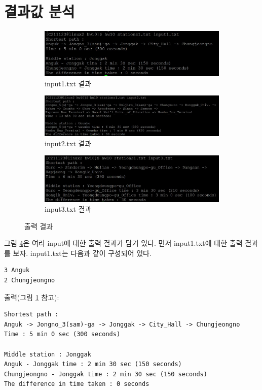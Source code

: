 \documentclass{article}
\begin{document}
\section{결과값 분석}
\begin{figure}
    \centering
    \begin{subfigure} {\textwidth}
        \centering
        \includegraphics[width=\textwidth]{result_1.jpg}
        \caption{input1.txt 결과}
        \label{fig:result1}
    \end{subfigure}
    \vfill
    \begin{subfigure} {\textwidth}
        \centering
        \includegraphics[width=\textwidth]{result_2.jpg}
        \caption{input2.txt 결과}
        \label{fig:result2}
    \end{subfigure}
    \vfill
    \begin{subfigure} {\textwidth}
        \centering
        \includegraphics[width=\textwidth]{result_3.jpg}
        \caption{input3.txt 결과}
        \label{fig:result3}
    \end{subfigure}
    \caption{출력 결과}
    \label{fig:result_all}
\end{figure}

그림 \ref{fig:result_all}은 여러 input에 대한 출력 결과가 담겨 있다. 먼저 input1.txt에 대한 출력 결과를 보자. input1.txt는 다음과 같이 구성되어 있다.
\begin{verbatim}
3 Anguk
2 Chungjeongno
\end{verbatim}
출력(그림 \ref{fig:result1} 참고): 
\begin{verbatim}
Shortest path :
Anguk -> Jongno_3(sam)-ga -> Jonggak -> City_Hall -> Chungjeongno
Time : 5 min 0 sec (300 seconds)

Middle station : Jonggak
Anguk - Jonggak time : 2 min 30 sec (150 seconds)
Chungjeongno - Jonggak time : 2 min 30 sec (150 seconds)
The difference in time taken : 0 seconds
\end{verbatim}
\end{document}
